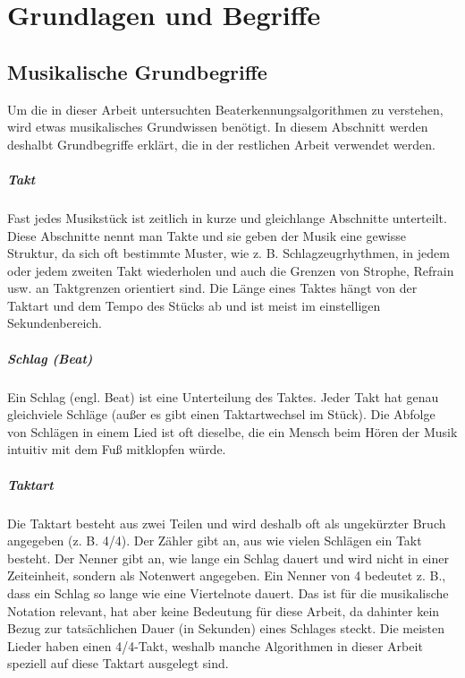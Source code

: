 \chapter{Grundlagen und Begriffe}
\label{grundlagen}

\section{Musikalische Grundbegriffe}
{
	Um die in dieser Arbeit untersuchten Beaterkennungsalgorithmen zu verstehen,
		wird etwas musikalisches Grundwissen benötigt.
	In diesem Abschnitt werden deshalbt Grundbegriffe erklärt,
		die in der restlichen Arbeit verwendet werden.

	\paragraph{Takt}
	{
		Fast jedes Musikstück ist zeitlich in kurze und gleichlange Abschnitte unterteilt.
		Diese Abschnitte nennt man Takte
			und sie geben der Musik eine gewisse Struktur,
			da sich oft bestimmte Muster, wie z. B. Schlagzeugrhythmen, in jedem oder jedem zweiten Takt wiederholen
			und auch die Grenzen von Strophe, Refrain usw. an Taktgrenzen orientiert sind.
		Die Länge eines Taktes hängt von der Taktart und dem Tempo des Stücks ab
			und ist meist im einstelligen Sekundenbereich.
	}

	\paragraph{Schlag (Beat)}
	{
		Ein Schlag (engl. Beat) ist eine Unterteilung des Taktes.
		Jeder Takt hat genau gleichviele Schläge (au{\ss}er es gibt einen Taktartwechsel im Stück).
		Die Abfolge von Schlägen in einem Lied ist oft dieselbe,
			die ein Mensch beim Hören der Musik intuitiv mit dem Fu{\ss} mitklopfen würde.
	}

	\paragraph{Taktart}
	{
		Die Taktart besteht aus zwei Teilen
			und wird deshalb oft als ungekürzter Bruch angegeben (z. B. 4/4).
		Der Zähler gibt an,
			aus wie vielen Schlägen ein Takt besteht.
		Der Nenner gibt an,
			wie lange ein Schlag dauert
			und wird nicht in einer Zeiteinheit,
			sondern als Notenwert angegeben.
		Ein Nenner von 4 bedeutet z. B.,
			dass ein Schlag so lange wie eine Viertelnote dauert.
		Das ist für die musikalische Notation relevant,
			hat aber keine Bedeutung für diese Arbeit,
			da dahinter kein Bezug zur tatsächlichen Dauer (in Sekunden) eines Schlages steckt.
		Die meisten Lieder haben einen 4/4-Takt,
			weshalb manche Algorithmen in dieser Arbeit speziell auf diese Taktart ausgelegt sind.
	}

}
